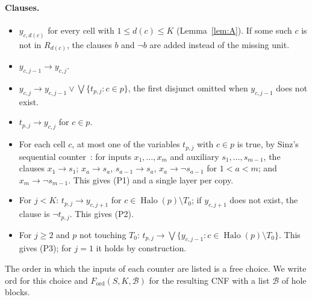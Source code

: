 \documentclass[10pt,a4paper]{article}
\theoremstyle{definition}
\theoremstyle{remark}
\newcommand{\Halo}{\operatorname{Halo}}
\begin{document}
\paragraph{Clauses.}
\begin{itemize}
\item[(F)] $y_{c,d(c)}$ for every cell with $1\leq d(c)\leq K$
(Lemma~\ref{lem:A}). If some such $c$ is not in $R_{d(c)}$, the clauses
$b$ and $\neg b$ are added instead of the missing unit.
\item[(Y1)] $y_{c,j-1}\to y_{c,j}$.
\item[(Y2)] $y_{c,j}\to y_{c,j-1}\vee\bigvee\{t_{p,j}: c\in p\}$, the
first disjunct omitted when $y_{c,j-1}$ does not exist.
\item[(B)] $t_{p,j}\to y_{c,j}$ for $c\in p$.
\item[(C)] For each cell $c$, at most one of the variables $t_{p,j}$ with
$c\in p$ is true, by Sinz's sequential counter~\cite{Sinz}: for inputs
$x_1,\dots,x_m$ and auxiliary $s_1,\dots,s_{m-1}$, the clauses
$x_1\to s_1$; $x_a\to s_a$, $s_{a-1}\to s_a$, $x_a\to\neg s_{a-1}$ for
$1<a<m$; and $x_m\to\neg s_{m-1}$. This gives (P1) and a single layer per
copy.
\item[(D)] For $j<K$: $t_{p,j}\to y_{c,j+1}$ for $c\in\Halo(p)\setminus
T_0$; if $y_{c,j+1}$ does not exist, the clause is $\neg t_{p,j}$. This
gives (P2).
\item[(E)] For $j\geq2$ and $p$ not touching $T_0$:
$t_{p,j}\to\bigvee\{y_{c,j-1}: c\in\Halo(p)\setminus T_0\}$. This gives
(P3); for $j=1$ it holds by construction.
\end{itemize}
The order in which the inputs of each counter are listed is a free
choice. We write $\mathrm{ord}$ for this choice and
$F_{\mathrm{ord}}(S,K,\mathcal B)$ for the resulting CNF with a list
$\mathcal B$ of hole blocks.
\end{document}
